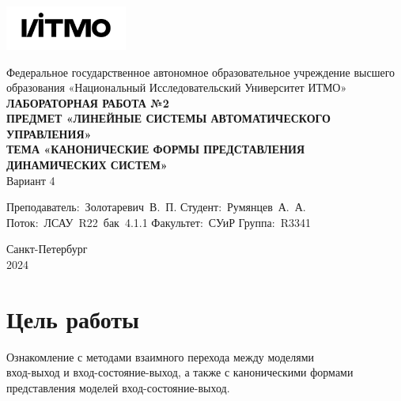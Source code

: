 \documentclass[a4paper, 12pt]{article}
\begin{document}
    \begin{titlepage}

        \begin{center}
        \includegraphics[width=0.3\textwidth]{itmo.png} %
        \vfill
        
        Федеральное государственное автономное образовательное учреждение высшего образования
        «Национальный Исследовательский Университет ИТМО»\\
        
        \vfill
        {\large\bf ЛАБОРАТОРНАЯ РАБОТА №2}\\
        {\large\bf ПРЕДМЕТ «ЛИНЕЙНЫЕ СИСТЕМЫ АВТОМАТИЧЕСКОГО УПРАВЛЕНИЯ»}\\
        {\large\bf ТЕМА «КАНОНИЧЕСКИЕ ФОРМЫ ПРЕДСТАВЛЕНИЯ ДИНАМИЧЕСКИХ СИСТЕМ»}\\
        Вариант 4
        \vfill

        \begin{flushright}
            \begin{minipage}{.45\textwidth}
            {
                \hbox{Преподаватель: Золотаревич В. П.}
                \hbox{Студент: Румянцев А. А.}
                \hbox{Поток: ЛСАУ R22 бак 4.1.1}
                \hbox{}
                \hbox{Факультет: СУиР}
                \hbox{Группа: R3341}
            }
            \end{minipage}
        \end{flushright}
        
        \vfill
                
        Санкт-Петербург\\
        2024
        \end{center}
    \end{titlepage}
    
    \tableofcontents

    \newpage
    \section{Цель работы}
    Ознакомление с методами взаимного перехода между моделями \\
    вход-выход и вход-состояние-выход, а также с каноническими формами представления
    моделей вход-состояние-выход.
\end{document}
